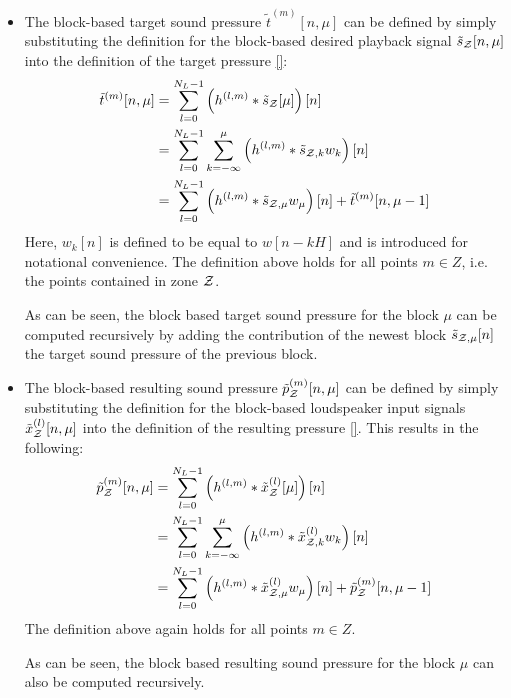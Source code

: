\begin{itemize}
    \item 
        The block-based target sound pressure $\tilde{t}^{(m)}[n, \mu]$ can be defined by simply 
        substituting the definition for the block-based desired playback signal $\tilde{s}_{\mathcal{Z}}[n, \mu]$ into the definition of the target pressure \autoref{}:
        \begin{equation}
            \begin{aligned}
                \tilde{t}^{(m)}[n, \mu] &= \sum_{l=0}^{N_L-1} \left(h^{(l,m)} \ast \tilde{s}_{\mathcal{Z}}[\mu]\right)[n]\\
                                        &= \sum_{l=0}^{N_L - 1}\sum_{k=-\infty}^{\mu}\left(h^{(l,m)}\ast\tilde{s}_{\mathcal{Z},k}w_k\right)[n] \\
                                   &= \sum_{l=0}^{N_L-1}\left(h^{(l,m)}\ast\tilde{s}_{\mathcal{Z},\mu}w_\mu\right)[n] + \tilde{t}^{(m)}[n, \mu - 1]  
            \end{aligned}
        \end{equation}
        Here, $w_k[n]$ is defined to be equal to $w[n - kH]$ and is introduced for notational convenience.  
        The definition above holds for all points $m\in Z$, i.e. the points contained in zone $\mathcal{Z}$.  

        As can be seen, the block based target sound pressure for the block $\mu$ can be computed recursively by adding the contribution of the newest block 
        $\tilde{s}_{\mathcal{Z},\mu}[n]$ the target sound pressure of the previous block.
    \item 
        The block-based resulting sound pressure $\tilde{p}_{\mathcal{Z}}^{(m)}[n, \mu]$ can be defined by simply 
        substituting the definition for the block-based loudspeaker input signals $\tilde{x}_{\mathcal{Z}}^{(l)}[n, \mu]$ into the definition of the resulting pressure \autoref{}.
        This results in the following: 
        \begin{equation}
            \begin{aligned}
                \tilde{p}_\zz^{(m)}[n, \mu] &= \sum_{l=0}^{N_L-1} \left(h^{(l,m)} \ast \tilde{x}^{(l)}_\zz[\mu]\right)[n]\\
                                            &= \sum_{l=0}^{N_L - 1}\sum_{k=-\infty}^{\mu}\left(h^{(l,m)}\ast\tilde{x}^{(l)}_{\zz,k}w_k\right)[n] \\
                                            &= \sum_{l=0}^{N_L-1}\left(h^{(l,m)}\ast\tilde{x}^{(l)}_{\zz,\mu}w_\mu\right)[n] + \tilde{p}_\zz^{(m)}[n, \mu - 1]  
 
            \end{aligned}
        \end{equation}
        The definition above again holds for all points $m\in Z$.  

        As can be seen, the block based resulting sound pressure for the block $\mu$ can also be computed recursively.
\end{itemize}

